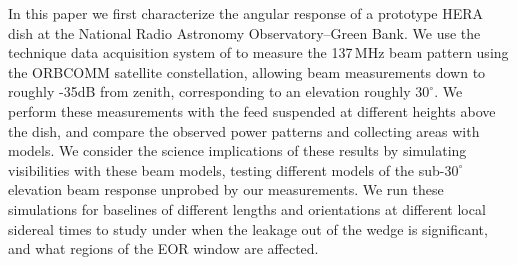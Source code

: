 \documentclass[preprint]{aastex}
\begin{document}

In this paper we first characterize the angular response of a prototype HERA dish at the National Radio 
Astronomy Observatory--Green Bank. We use the technique data acquisition system of \citet{neben15} to 
measure the 137\,MHz beam pattern using the ORBCOMM satellite constellation, allowing beam 
measurements down to roughly -35dB from zenith, corresponding to an elevation roughly $30^\circ$. We 
perform these measurements with the feed suspended at different heights above the dish, and compare the 
observed power patterns and collecting areas with models. We consider the science implications of these 
results by simulating visibilities with these beam models, testing different models of the sub-$30^\circ$ 
elevation beam response unprobed by our measurements. We run these simulations for baselines of different 
lengths and orientations at different local sidereal times to study under when the leakage out of the wedge is 
significant, and what regions of the EOR window are affected.
\end{document}

